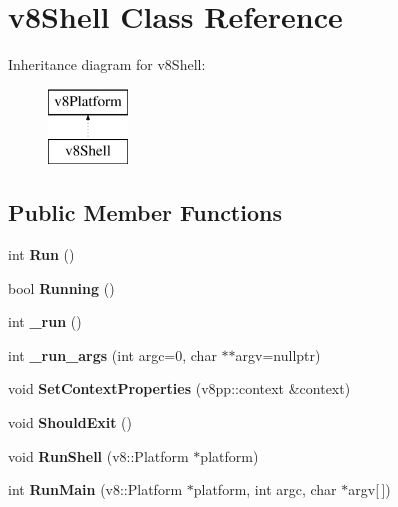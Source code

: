 \hypertarget{classv8Shell}{}\section{v8\+Shell Class Reference}
\label{classv8Shell}
Inheritance diagram for v8\+Shell\+:\begin{figure}[H]
\begin{center}
\leavevmode
\includegraphics[height=2.000000cm]{classv8Shell}
\end{center}
\end{figure}
\subsection*{Public Member Functions}
\begin{DoxyCompactItemize}
\item 
\mbox{\label{classv8Shell_a33d06507857d3144eee8e0bf5d38508f}} 
int {\bfseries Run} ()
\item 
\mbox{\label{classv8Shell_ac6c76de48d6511a9792aa6ba8b28fda0}} 
bool {\bfseries Running} ()
\item 
\mbox{\label{classv8Shell_a29797142df03589900cfa57d645a7475}} 
int {\bfseries \+\_\+run} ()
\item 
\mbox{\label{classv8Shell_a67a11c0fe0d19107edf059ca51845b39}} 
int {\bfseries \+\_\+run\+\_\+args} (int argc=0, char $\ast$$\ast$argv=nullptr)
\item 
\mbox{\label{classv8Shell_aaf984192023ad1310dde36a19796ce2b}} 
void {\bfseries Set\+Context\+Properties} (v8pp\+::context \&context)
\item 
\mbox{\label{classv8Shell_a04a48d472c88638ae0faa2c919cf7f5c}} 
void {\bfseries Should\+Exit} ()
\item 
\mbox{\label{classv8Shell_ad77db9a7f7163df5c09fff9ff519ee4e}} 
void {\bfseries Run\+Shell} (v8\+::\+Platform $\ast$platform)
\item 
\mbox{\label{classv8Shell_a50532bc0097c0c9d014d24f234876080}} 
int {\bfseries Run\+Main} (v8\+::\+Platform $\ast$platform, int argc, char $\ast$argv\mbox{[}$\,$\mbox{]})
\end{DoxyCompactItemize}
